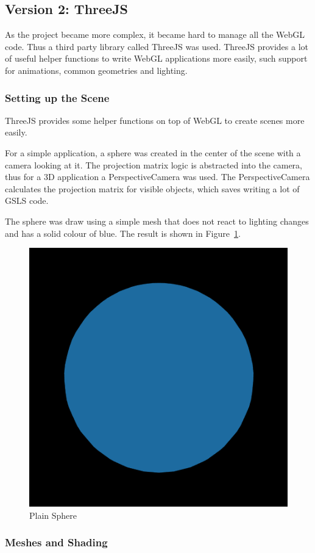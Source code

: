 \documentclass[]{article}
\begin{document}
\subsection{Version 2: ThreeJS}

As the project became more complex, it became hard to manage all the WebGL code.
Thus a third party library called ThreeJS was used.
ThreeJS provides a lot of useful helper functions to write WebGL applications more easily,
such support for animations, common geometries and lighting.

\subsubsection{Setting up the Scene}

ThreeJS provides some helper functions on top of WebGL to create scenes more easily.

For a simple application, a sphere was created in the center of the scene with a camera looking at it.
The projection matrix logic is abstracted into the camera, thus for a 3D application a PerspectiveCamera was used.
The PerspectiveCamera calculates the projection matrix for visible objects, which saves writing a lot of GSLS code.

The sphere was draw using a simple mesh that does not react to lighting changes and has a solid colour of blue.
The result is shown in Figure~\ref{fig:plainSphere}.

\begin{figure}[H]
   \centering
   \includegraphics[width=0.5\linewidth]{images/plain_sphere}
   \caption{Plain Sphere}
   \label{fig:plainSphere}
\end{figure}

\subsubsection{Meshes and Shading}
\end{document}
